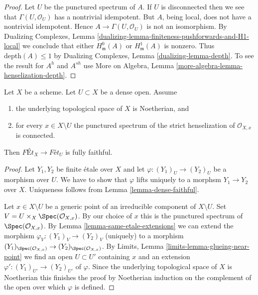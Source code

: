 \begin{proof}
Let $U$ be the punctured spectrum of $A$.
If $U$ is disconnected then we see that
$\Gamma(U, \mathcal{O}_U)$ has a nontrivial idempotent.
But $A$, being local, does not have a nontrivial idempotent.
Hence $A \to \Gamma(U, \mathcal{O}_U)$ is not an isomorphism.
By Dualizing Complexes, Lemma
\ref{dualizing-lemma-finiteness-pushforwards-and-H1-local}
we conclude that either $H^0_\mathfrak m(A)$ or $H^1_\mathfrak m(A)$
is nonzero. Thus $\text{depth}(A) \leq 1$ by
Dualizing Complexes, Lemma \ref{dualizing-lemma-depth}.
To see the result for $A^h$ and $A^{sh}$ use
More on Algebra, Lemma \ref{more-algebra-lemma-henselization-depth}.
\end{proof}

\begin{lemma}
\label{lemma-quasi-compact-dense-open-connected-at-infinity-Noetherian}
Let $X$ be a scheme. Let $U \subset X$ be a dense open. Assume
\begin{enumerate}
\item the underlying topological space of $X$ is Noetherian, and
\item for every $x \in X \setminus U$ the punctured spectrum of the
strict henselization of $\mathcal{O}_{X, x}$ is connected.
\end{enumerate}
Then $\textit{F\'Et}_X \to \textit{F\'et}_U$ is fully faithful.
\end{lemma}

\begin{proof}
Let $Y_1, Y_2$ be finite \'etale over $X$ and let
$\varphi : (Y_1)_U \to (Y_2)_U$ be a morphism over $U$. We have to show that
$\varphi$ lifts uniquely to a morphsm $Y_1 \to Y_2$ over $X$.
Uniqueness follows from Lemma \ref{lemma-dense-faithful}.

\medskip\noindent
Let $x \in X \setminus U$ be a generic point of an irreducible component
of $X \setminus U$. Set $V = U \times_X \Spec(\mathcal{O}_{X, x})$.
By our choice of $x$ this is the punctured spectrum of
$\Spec(\mathcal{O}_{X, x})$. By
Lemma \ref{lemma-same-etale-extensions}
we can extend the morphism $\varphi_V : (Y_1)_V \to (Y_2)_V$
(uniquely) to a morphism
$(Y_1)_{\Spec(\mathcal{O}_{X, x})} \to (Y_2)_{\Spec(\mathcal{O}_{X, x})}$.
By Limits, Lemma \ref{limits-lemma-glueing-near-point}
we find an open $U \subset U'$ containing $x$ and an extension
$\varphi' : (Y_1)_{U'} \to (Y_2)_{U'}$ of $\varphi$.
Since the underlying topological space of $X$ is Noetherian
this finishes the proof by Noetherian induction on the complement
of the open over which $\varphi$ is defined.
\end{proof}

